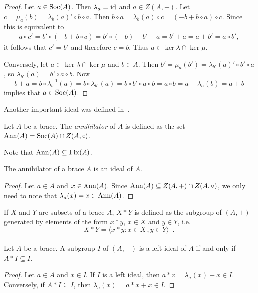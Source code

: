 \begin{proof}
    Let $a\in\operatorname{Soc}(A)$. Then $\lambda_a=\operatorname{id}$ and $a\in Z(A,+)$. Let $c=\mu_a(b)=\lambda_b(a)'\circ b\circ a$. Then
    $b\circ a=\lambda_b(a)\circ c=(-b+b\circ a)\circ c$. Since this is equivalent to 
    \begin{align*}
        a\circ c'=b'\circ (-b+b\circ a)=b'\circ (-b)-b'+a=b'+a=a+b'=a\circ b',
    \end{align*}
    it follows that $c'=b'$ and therefore $c=b$. Thus $a\in\ker\lambda\cap\ker\mu$. 
    
    Conversely, let $a\in\ker\lambda\cap\ker\mu$ and $b\in A$. Then $b'=\mu_a(b')=\lambda_{b'}(a)'\circ b'\circ a$, so
    $\lambda_{b'}(a)=b'\circ a\circ b$. Now 
    \[
    b+a=b\circ\lambda^{-1}_b(a)=b\circ\lambda_{b'}(a)=b\circ b'\circ a\circ b=a\circ b=a+\lambda_a(b)=a+b
    \]
    implies that $a\in\operatorname{Soc}(A)$. 
\end{proof}

Another important ideal was defined in~\cite{MR3917122}.

\begin{definition}
Let $A$ be a brace. The \emph{annihilator} of $A$ is 
defined as the set $\operatorname{Ann}(A)=\operatorname{Soc}(A)\cap Z(A,\circ)$. 
\end{definition}

Note that $\operatorname{Ann}(A)\subseteq\operatorname{Fix}(A)$. 

\begin{proposition}
The annihilator of a brace $A$ is an ideal of $A$. 
\end{proposition}

\begin{proof}
    Let $a\in A$ and $x\in\operatorname{Ann}(A)$. Since $\operatorname{Ann}(A)\subseteq Z(A,+)\cap Z(A,\circ)$, 
    we only need to note that $\lambda_a(x)=x\in\operatorname{Ann}(A)$. 
\end{proof}


If $X$ and $Y$ are subsets of a brace $A$, $X*Y$ is defined as the 
subgroup of $(A,+)$ generated by elements of the form $x*y$, $x\in X$ and $y\in Y$, i.e.
\[
X*Y=\langle x*y:x\in X\,,y\in Y\rangle_+.
\]

\begin{proposition}
    \label{pro:A*I}
    Let $A$ be a brace. A subgroup $I$ of $(A,+)$ is 
    a left ideal of $A$ if and only if $A*I\subseteq I$.
\end{proposition}

\begin{proof}
    Let $a\in A$ and $x\in I$. If $I$ is a
    left ideal, then $a*x=\lambda_a(x)-x\in I$. Conversely, if $A*I\subseteq
    I$, then $\lambda_a(x)=a*x+x\in I$.
\end{proof}

